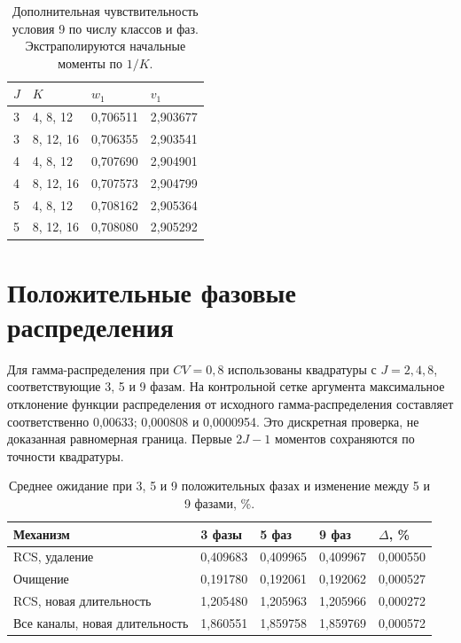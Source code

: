 \documentclass[a4paper,12pt]{article}
\begin{document}
\begin{table}[!htbp]
\centering\small\setlength{\tabcolsep}{2pt}
\begin{tabular}{@{}p{1.42cm}p{4.72cm}p{4.72cm}p{4.72cm}@{}}
\toprule
$J$ & $K$ & $w_1$ & $v_1$ \\
\midrule
3 & 4, 8, 12 & 0,706511 & 2,903677 \\
3 & 8, 12, 16 & 0,706355 & 2,903541 \\
4 & 4, 8, 12 & 0,707690 & 2,904901 \\
4 & 8, 12, 16 & 0,707573 & 2,904799 \\
5 & 4, 8, 12 & 0,708162 & 2,905364 \\
5 & 8, 12, 16 & 0,708080 & 2,905292 \\
\bottomrule
\end{tabular}
\caption{Дополнительная чувствительность условия 9 по числу классов и фаз. Экстраполируются начальные моменты по \(1/K\).}
\label{tab:case09}
\end{table}



\section{Положительные фазовые распределения}
Для гамма-распределения при \(CV=0{,}8\) использованы квадратуры с \(J=2,4,8\), соответствующие 3, 5 и 9 фазам. На контрольной сетке аргумента максимальное отклонение функции распределения от исходного гамма-распределения составляет соответственно 0{,}00633; 0{,}000808 и 0{,}0000954. Это дискретная проверка, не доказанная равномерная граница. Первые \(2J-1\) моментов сохраняются по точности квадратуры.

\begin{table}[!htbp]
\centering\small\setlength{\tabcolsep}{2pt}
\begin{tabular}{@{}p{5.76cm}p{2.55cm}p{2.55cm}p{2.55cm}p{2.17cm}@{}}
\toprule
Механизм & 3 фазы & 5 фаз & 9 фаз & $\Delta$, \% \\
\midrule
RCS, удаление & 0,409683 & 0,409965 & 0,409967 & 0,000550 \\
Очищение & 0,191780 & 0,192061 & 0,192062 & 0,000527 \\
RCS, новая длительность & 1,205480 & 1,205963 & 1,205966 & 0,000272 \\
Все каналы, новая длительность & 1,860551 & 1,859758 & 1,859769 & 0,000572 \\
\bottomrule
\end{tabular}
\caption{Среднее ожидание при 3, 5 и 9 положительных фазах и изменение между 5 и 9 фазами, \%.}
\label{tab:ph}
\end{table}
\end{document}
